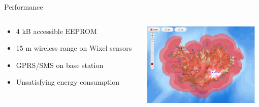 \documentclass{beamer}
\begin{document}
\begin{frame}{Performance}
\begin{columns}[T] %
     \begin{column}[T]{4cm} %
		\begin{itemize}
		\item 4 kB accessible EEPROM
		\item 15 m wireless range on Wixel sensors
		\item GPRS/SMS on base station	 
		\item Unsatisfying energy consumption 
		\end{itemize}

		\end{column}
		\begin{column}[T]{5cm} %
	     \includegraphics[height=4cm]{graphics/GSM_Coverage.PNG}
	     \cite{vodafone}
		\end{column}
	\end{columns}
\end{frame}
\end{document}

